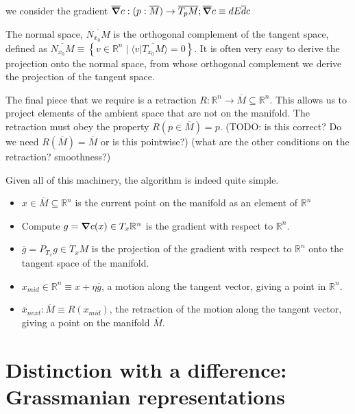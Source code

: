 \documentclass[11pt]{book}
\begin{document}
we consider the gradient
$\overline \grad c : (p: \overline M) \rightarrow \overline{T_p M}; \overline \grad c \equiv dE \overline dc$

The normal space,
$\overline{N_{x_0} M}$ is the orthogonal complement of the tangent space, defined
as $\overline{N_{x_0} M} \equiv \left\{ v \in \mathbb R^n \mid \langle v | \overline{T_{x_0} M} \rangle = 0 \right\}$.
It is often very easy to derive the projection onto the normal space, from
whose orthogonal complement we derive the projection of the tangent space.

The final piece that we require is a retraction $R: \mathbb R^n \rightarrow \overline M \subseteq \mathbb R^n$. This allows
us to project elements of the ambient space that are not on the manifold. The
retraction must obey the property $R(p \in \overline M) = p$.
(TODO: is this correct? Do we need $R(\overline M) = \overline M$ or is this pointwise?)
(what are the other conditions on the retraction? smoothness?)

Given all of this machinery, the algorithm is indeed quite simple. 

\begin{itemize}
    \item $x \in \overline M \subseteq \mathbb R^n$ is the current point on the manifold as an element of $\mathbb R^n$
    \item Compute $g = \grad c(x) \in T_x \mathbb R^n$ is the gradient with respect to $\mathbb R^n$.
    \item $\overline g = P_{T_x} g \in T_x M$ is the projection of the gradient with respect to $\mathbb R^n$ onto the 
            tangent space of the manifold.
    \item $x_{mid}\in \mathbb R^n \equiv x + \eta \overline g$, a motion along the tangent vector, giving a point in
            $\mathbb R^n$.
    \item $\overline x_{next}: \overline M \equiv R(x_{mid})$, the retraction of the motion along the tangent vector,
        giving a point on the manifold $\overline M$.
\end{itemize}


\chapter{Distinction with a difference: Grassmanian representations}
\end{document}
